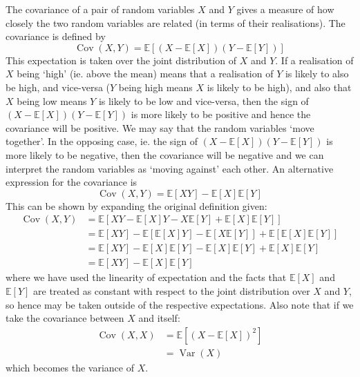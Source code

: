 \documentclass[11pt]{report} %
\begin{document}
The covariance of a pair of random variables $X$ and $Y$ gives a measure of how closely the two random variables are related (in terms of their realisations). The covariance is defined by
\begin{equation}
\operatorname{Cov}\left(X, Y\right) = \mathbb{E}\left[\left(X - \mathbb{E}\left[X\right]\right)\left(Y - \mathbb{E}\left[Y\right]\right)\right]
\end{equation}
This expectation is taken over the joint distribution of $X$ and $Y$. If a realisation of $X$ being `high' (ie. above the mean) means that a realisation of $Y$ is likely to also be high, and vice-versa ($Y$ being high means $X$ is likely to be high), and also that $X$ being low means $Y$ is likely to be low and vice-versa, then the sign of $\left(X - \mathbb{E}\left[X\right]\right)\left(Y - \mathbb{E}\left[Y\right]\right)$ is more likely to be positive and hence the covariance will be positive. We may say that the random variables `move together'. In the opposing case, ie. the sign of $\left(X - \mathbb{E}\left[X\right]\right)\left(Y - \mathbb{E}\left[Y\right]\right)$ is more likely to be negative, then the covariance will be negative and we can interpret the random variables as `moving against' each other. An alternative expression for the covariance is
\begin{equation}
\operatorname{Cov}\left(X, Y\right) = \mathbb{E}\left[XY\right] - \mathbb{E}\left[X\right]\mathbb{E}\left[Y\right]
\end{equation}
This can be shown by expanding the original definition given:
\begin{align}
\operatorname{Cov}\left(X, Y\right) &= \mathbb{E}\left[XY - \mathbb{E}\left[X\right]Y - X\mathbb{E}\left[Y\right] + \mathbb{E}\left[X\right]\mathbb{E}\left[Y\right]\right] \\
&= \mathbb{E}\left[XY\right] - \mathbb{E}\left[\mathbb{E}\left[X\right]Y\right] - \mathbb{E}\left[X\mathbb{E}\left[Y\right]\right] + \mathbb{E}\left[\mathbb{E}\left[X\right]\mathbb{E}\left[Y\right]\right] \\
&= \mathbb{E}\left[XY\right] - \mathbb{E}\left[X\right]\mathbb{E}\left[Y\right] - \mathbb{E}\left[X\right]\mathbb{E}\left[Y\right] + \mathbb{E}\left[X\right]\mathbb{E}\left[Y\right] \\
&= \mathbb{E}\left[XY\right] - \mathbb{E}\left[X\right]\mathbb{E}\left[Y\right]
\end{align}
where we have used the linearity of expectation and the facts that $\mathbb{E}\left[X\right]$ and $\mathbb{E}\left[Y\right]$ are treated as constant with respect to the joint distribution over $X$ and $Y$, so hence may be taken outside of the respective expectations. Also note that if we take the covariance between $X$ and itself:
\begin{align}
\operatorname{Cov}\left(X, X\right) &= \mathbb{E}\left[\left(X - \mathbb{E}\left[X\right]\right)^{2}\right] \\
&= \operatorname{Var}\left(X\right)
\end{align}
which becomes the variance of $X$.
\end{document}
